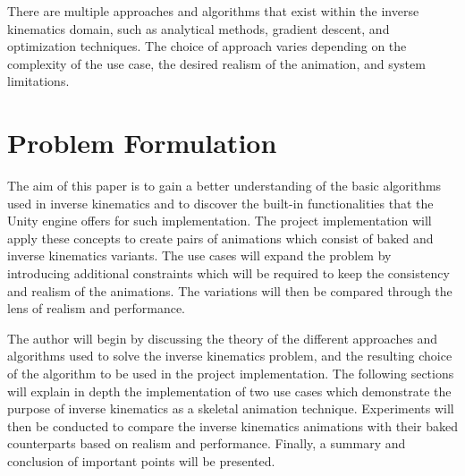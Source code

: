 There are multiple approaches and algorithms that exist within the inverse
kinematics domain, such as analytical methods, gradient descent, and
optimization techniques. The choice of approach varies depending on the
complexity of the use case, the desired realism of the animation, and system
limitations.

\section{Problem Formulation}

The aim of this paper is to gain a better understanding of the basic algorithms
used in inverse kinematics and to discover the built-in functionalities that the
Unity engine offers for such implementation. The project implementation will
apply these concepts to create pairs of animations which consist of baked and
inverse kinematics variants. The use cases will expand the problem by
introducing additional constraints which will be required to keep the
consistency and realism of the animations. The variations will then be compared
through the lens of realism and performance.

The author will begin by discussing the theory of the different approaches and
algorithms used to solve the inverse kinematics problem, and the resulting
choice of the algorithm to be used in the project implementation. The following
sections will explain in depth the implementation of two use cases which
demonstrate the purpose of inverse kinematics as a skeletal animation technique.
Experiments will then be conducted to compare the inverse kinematics animations
with their baked counterparts based on realism and performance. Finally,
a summary and conclusion of important points will be presented.
